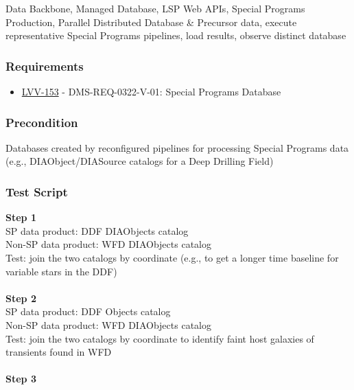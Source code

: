 Data Backbone, Managed Database, LSP Web APIs, Special Programs
Production, Parallel Distributed Database \& Precursor data, execute
representative Special Programs pipelines, load results, observe
distinct database

\hypertarget{requirements-71}{%
\subsubsection{Requirements}\label{requirements-71}}

\begin{itemize}
\tightlist
\item
  \href{https://jira.lsstcorp.org/browse/LVV-153}{LVV-153} -
  DMS-REQ-0322-V-01: Special Programs Database
\end{itemize}

\hypertarget{precondition-13}{%
\subsubsection{Precondition}\label{precondition-13}}

Databases created by reconfigured pipelines for processing Special
Programs data (e.g., DIAObject/DIASource catalogs for a Deep Drilling
Field)

\hypertarget{test-script-71}{%
\subsubsection{Test Script}\label{test-script-71}}

\textbf{Step 1}\\
SP data product: DDF DIAObjects catalog\\
Non-SP data product: WFD DIAObjects catalog\\
Test: join the two catalogs by coordinate (e.g., to get a longer time
baseline for variable stars in the DDF)\\
~\\
\textbf{Step 2}\\
SP data product: DDF Objects catalog\\
Non-SP data product: WFD DIAObjects catalog\\
Test: join the two catalogs by coordinate to identify faint host
galaxies of transients found in WFD\\
~\\
\textbf{Step 3}\\
~\\
~\\

